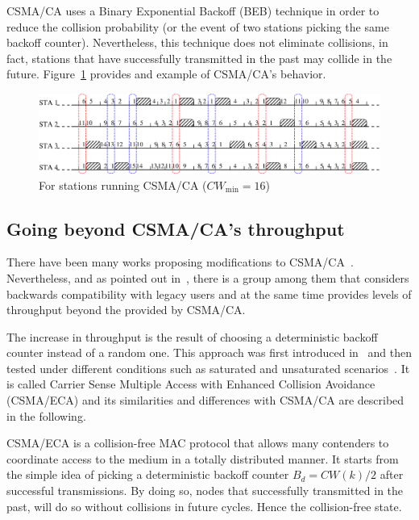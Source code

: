 CSMA/CA uses a Binary Exponential Backoff (BEB) technique in order to reduce the collision probability (or the event of two stations picking the same backoff counter). Nevertheless, this technique does not eliminate collisions, in fact, stations that have successfully transmitted in the past may collide in the future. Figure~\ref{fig:csmaCA} provides and example of CSMA/CA's behavior.

\begin{figure}[htbp]
  \centering
  \includegraphics[width=\linewidth]{csma_ca_short.eps}
  \caption{For stations running CSMA/CA ($CW_{\min}=16$)
  \label{fig:csmaCA}}
\end{figure}

\subsection{Going beyond CSMA/CA's throughput}
There have been many works proposing modifications to CSMA/CA~\cite{CSMA_ECA,bellalta2009vtc,L_MAC2,HE,bharghavan1994map,wang2004ncr,cali2000dti,lopez-toledo2006aoi,barcelo2008lba,hui2011epp,barcelo2011tcf}. Nevertheless, and as pointed out in~\cite{research2standards}, there is a group among them that considers backwards compatibility with legacy users and at the same time provides levels of throughput beyond the provided by CSMA/CA.

The increase in throughput is the result of choosing a deterministic backoff counter instead of a random one. This approach was first introduced in~\cite{barcelo2008lba} and then tested under different conditions such as saturated and unsaturated scenarios~\cite{CSMA_ECA,bellalta2009vtc,L_MAC2,HE}. It is called Carrier Sense Multiple Access with Enhanced Collision Avoidance (CSMA/ECA) and its similarities and differences with CSMA/CA are described in the following.

CSMA/ECA is a collision-free MAC protocol that allows many contenders to coordinate access to the medium in a totally distributed manner. It starts from the simple idea of picking a deterministic backoff counter $B_{d}=CW(k)/2$ after successful transmissions. By doing so, nodes that successfully transmitted in the past, will do so without collisions in future cycles. Hence the collision-free state.

